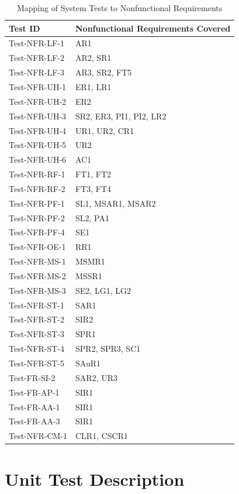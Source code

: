 \documentclass[12pt, titlepage]{article}
\begin{document}
\begin{table}[H]
\centering
\begin{tabular}{|l|l|}
\hline
\textbf{Test ID} & \textbf{Nonfunctional Requirements Covered} \\
\hline
Test-NFR-LF-1 & AR1 \\
Test-NFR-LF-2 & AR2, SR1 \\
Test-NFR-LF-3 & AR3, SR2, FT5 \\
Test-NFR-UH-1 & ER1, LR1 \\
Test-NFR-UH-2 & ER2 \\
Test-NFR-UH-3 & SR2, ER3, PI1, PI2, LR2 \\
Test-NFR-UH-4 & UR1, UR2, CR1 \\
Test-NFR-UH-5 & UR2 \\
Test-NFR-UH-6 & AC1 \\
Test-NFR-RF-1 & FT1, FT2 \\
Test-NFR-RF-2 & FT3, FT4 \\
Test-NFR-PF-1 & SL1, MSAR1, MSAR2 \\
Test-NFR-PF-2 & SL2, PA1 \\
Test-NFR-PF-4 & SE1 \\
Test-NFR-OE-1 & RR1 \\
Test-NFR-MS-1 & MSMR1 \\
Test-NFR-MS-2 & MSSR1 \\
Test-NFR-MS-3 & SE2, LG1, LG2 \\
Test-NFR-ST-1 & SAR1 \\
Test-NFR-ST-2 & SIR2 \\
Test-NFR-ST-3 & SPR1 \\
Test-NFR-ST-4 & SPR2, SPR3, SC1 \\
Test-NFR-ST-5 & SAuR1 \\
Test-FR-SI-2 & SAR2, UR3 \\
Test-FR-AP-1 & SIR1 \\
Test-FR-AA-1 & SIR1 \\
Test-FR-AA-3 & SIR1 \\
Test-NFR-CM-1 & CLR1, CSCR1 \\
\hline
\end{tabular}
\caption{Mapping of System Tests to Nonfunctional Requirements}
\end{table}

\section{Unit Test Description}
\end{document}
